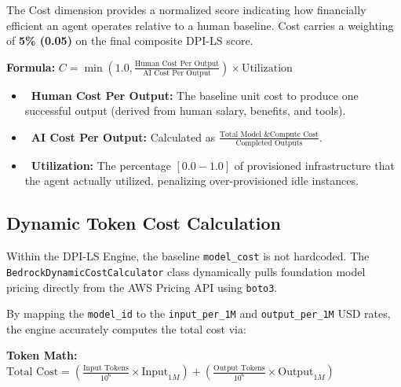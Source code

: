 \documentclass[11pt,a4paper]{article}
\begin{document}
The Cost dimension provides a normalized score indicating how financially efficient an agent operates relative to a human baseline. Cost carries a weighting of \textbf{5\% (0.05)} on the final composite DPI-LS score.

\begin{dpiimportant}
\textbf{Formula:} $C = \min\left(1.0, \frac{\text{Human Cost Per Output}}{\text{AI Cost Per Output}}\right) \times \text{Utilization}$
\end{dpiimportant}

\begin{itemize}
    \item \textbf{\color{dpiblue}\faUserTie\ Human Cost Per Output:} The baseline unit cost to produce one successful output (derived from human salary, benefits, and tools).
    \item \textbf{\color{dpiteal}\faRobot\ AI Cost Per Output:} Calculated as $\frac{\text{Total Model \& Compute Cost}}{\text{Completed Outputs}}$.
    \item \textbf{\color{dpired}\faChartPie\ Utilization:} The percentage $[0.0 - 1.0]$ of provisioned infrastructure that the agent actually utilized, penalizing over-provisioned idle instances.
\end{itemize}

\subsection{Dynamic Token Cost Calculation}

Within the DPI-LS Engine, the baseline \texttt{model\_cost} is not hardcoded. The \texttt{BedrockDynamicCostCalculator} class dynamically pulls foundation model pricing directly from the AWS Pricing API using \texttt{boto3}. 

By mapping the \texttt{model\_id} to the \texttt{input\_per\_1M} and \texttt{output\_per\_1M} USD rates, the engine accurately computes the total cost via:

\begin{dpiimportant}
\textbf{Token Math:} $\text{Total Cost} = \left(\frac{\text{Input Tokens}}{10^6} \times \text{Input}_{1M}\right) + \left(\frac{\text{Output Tokens}}{10^6} \times \text{Output}_{1M}\right)$
\end{dpiimportant}
\end{document}
